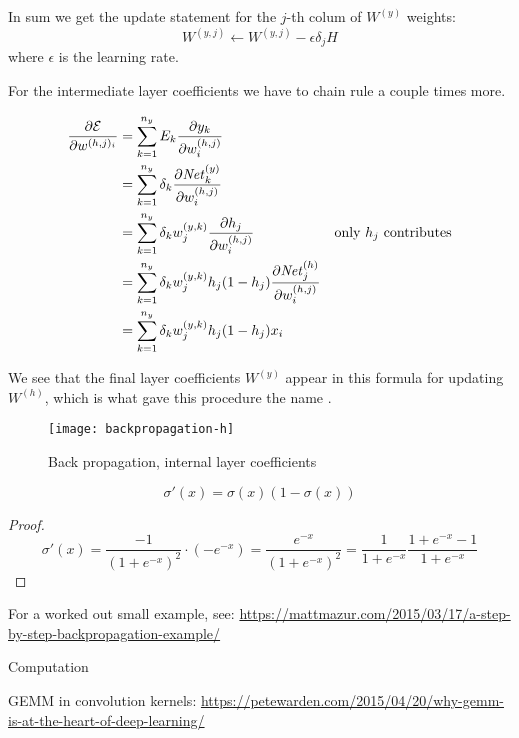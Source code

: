 In sum we get the update statement for the $j$-th colum of $W^{(y)}$
weights:
\[ W^{(y,j)} \leftarrow W^{(y,j)} - \epsilon \delta_j H \]
where $\epsilon$ is the learning rate.

For the intermediate layer coefficients we have to chain rule a couple
times more.

\begin{align}
  \frac{\partial{\cal E}}{\partial w^{(h,j)_i}}
  &=\sum_{k=1}^{n_y} E_k\frac{\partial y_k}{\partial w^{(h,j)}_i}\\
  &=\sum_{k=1}^{n_y} \delta_k\frac{\partial \mathord{\mathit{Net}}^{(y)}_k}{\partial w^{(h,j)}_i}\\
  &=\sum_{k=1}^{n_y} \delta_k w^{(y,k)}_j
  \frac{\partial h_j}{\partial w^{(h,j)}_i}
  &\hbox{only $h_j$ contributes}\\
  &=\sum_{k=1}^{n_y} \delta_k w^{(y,k)}_j h_j(1-h_j)
  \frac{\partial \mathord{\mathit{Net}}^{(h)}_j}{\partial w^{(h,j)}_i}\\
  &=\sum_{k=1}^{n_y} \delta_k w^{(y,k)}_j h_j(1-h_j) x_i\\
\end{align}

We see that the final layer coefficients $W^{(y)}$ appear in this
formula for updating~$W^{(h)}$, which
is what gave this procedure the name .

\begin{figure}[ht]
  \texttt{[image: backpropagation-h]}
  \caption{Back propagation, internal layer coefficients}
  \label{fig:backprop-h}
\end{figure}


\begin{lemma}
  \label{lemma:sigma-prime}
  \[ \sigma'(x) = \sigma(x)(1-\sigma(x)) \]
\end{lemma}
\begin{proof}
  \[
  \sigma'(x)=\frac{-1}{ (1+e^{-x})^2 }\cdot (-e^{-x})
  = \frac{e^{-x}}{ (1+e^{-x})^2 }
  = \frac{1}{ 1+e^{-x} } \frac{1+e^{-x}-1}{ 1+e^{-x} }
  \]
\end{proof}

For a worked out small example, see: \url{https://mattmazur.com/2015/03/17/a-step-by-step-backpropagation-example/}

 {Computation}

GEMM in convolution kernels:
\url{https://petewarden.com/2015/04/20/why-gemm-is-at-the-heart-of-deep-learning/}
